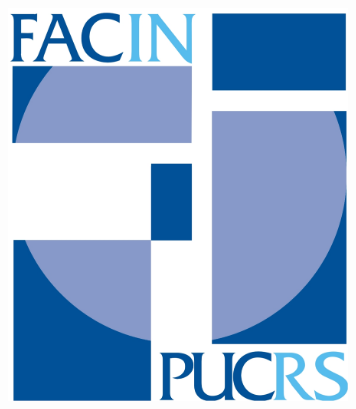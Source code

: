 \documentclass[a0,portrait]{a0poster}
\begin{document}
\begin{minipage}[c]{\linewidth}
{	\begin{minipage}[c]{0.15\linewidth}
		\begin{center}
			\includegraphics[width=9cm]{fig/logoFacin.pdf}
		\end{center}
	\end{minipage}}
	\\[0.1cm]%
\end{minipage}

\vspace{1cm}

\end{document}
